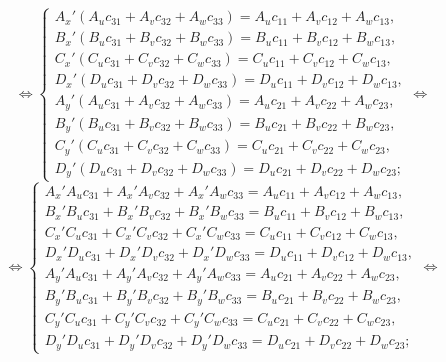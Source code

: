 \begin{equation*}
	\Leftrightarrow
	\begin{cases}
		A_x'\left( A_u c_{31} + A_v c_{32} + A_w c_{33} \right) = A_u c_{11} + A_v c_{12} + A_w c_{13},\\
		B_x'\left( B_u c_{31} + B_v c_{32} + B_w c_{33} \right) = B_u c_{11} + B_v c_{12} + B_w c_{13},\\
		C_x'\left( C_u c_{31} + C_v c_{32} + C_w c_{33} \right) = C_u c_{11} + C_v c_{12} + C_w c_{13},\\
		D_x'\left( D_u c_{31} + D_v c_{32} + D_w c_{33} \right) = D_u c_{11} + D_v c_{12} + D_w c_{13},\\
		A_y'\left( A_u c_{31} + A_v c_{32} + A_w c_{33} \right) = A_u c_{21} + A_v c_{22} + A_w c_{23},\\
		B_y'\left( B_u c_{31} + B_v c_{32} + B_w c_{33} \right) = B_u c_{21} + B_v c_{22} + B_w c_{23},\\
		C_y'\left( C_u c_{31} + C_v c_{32} + C_w c_{33} \right) = C_u c_{21} + C_v c_{22} + C_w c_{23},\\
		D_y'\left( D_u c_{31} + D_v c_{32} + D_w c_{33} \right) = D_u c_{21} + D_v c_{22} + D_w c_{23};
	\end{cases}
	\Leftrightarrow
\end{equation*}
\begin{equation*}
	\Leftrightarrow
	\begin{cases}
		A_x'A_u c_{31} + A_x'A_v c_{32} + A_x' A_w c_{33} = A_u c_{11} + A_v c_{12} + A_w c_{13},\\
		B_x'B_u c_{31} + B_x'B_v c_{32} + B_x' B_w c_{33} = B_u c_{11} + B_v c_{12} + B_w c_{13},\\
		C_x'C_u c_{31} + C_x'C_v c_{32} + C_x' C_w c_{33} = C_u c_{11} + C_v c_{12} + C_w c_{13},\\
		D_x'D_u c_{31} + D_x'D_v c_{32} + D_x' D_w c_{33} = D_u c_{11} + D_v c_{12} + D_w c_{13},\\
		A_y'A_u c_{31} + A_y'A_v c_{32} + A_y' A_w c_{33} = A_u c_{21} + A_v c_{22} + A_w c_{23},\\
		B_y'B_u c_{31} + B_y'B_v c_{32} + B_y' B_w c_{33} = B_u c_{21} + B_v c_{22} + B_w c_{23},\\
		C_y'C_u c_{31} + C_y'C_v c_{32} + C_y' C_w c_{33} = C_u c_{21} + C_v c_{22} + C_w c_{23},\\
		D_y'D_u c_{31} + D_y'D_v c_{32} + D_y' D_w c_{33} = D_u c_{21} + D_v c_{22} + D_w c_{23};
	\end{cases}
	\Leftrightarrow
\end{equation*}
